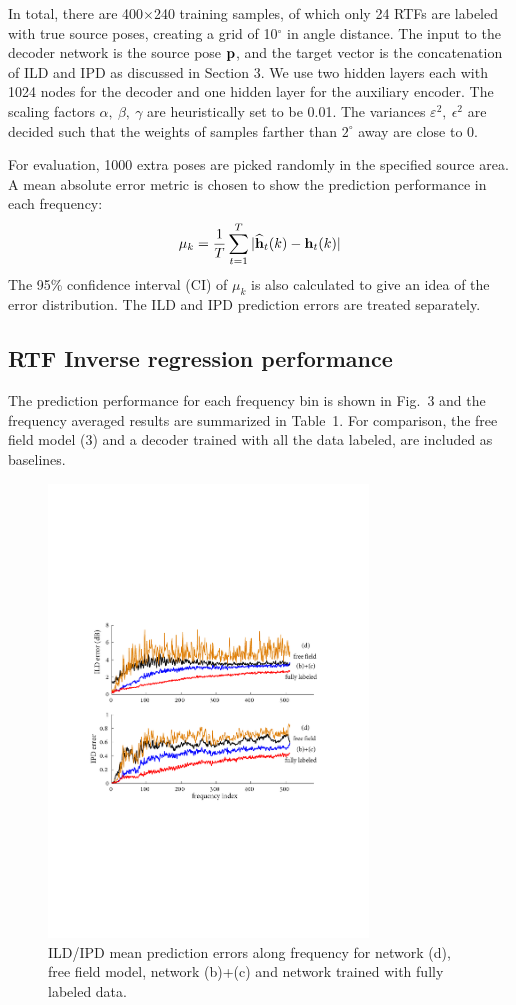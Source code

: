 \documentclass{article}
\begin{document}
In total, there are 400$\times$240 training samples, of which only 24 RTFs are labeled with true source poses, creating a grid of 10$^\circ$ in angle distance. The input to the decoder network is the source pose ${\bf p}$, and the target vector is the concatenation of ILD and IPD as discussed in Section 3. We use two hidden layers each with 1024 nodes for the decoder and one hidden layer for the auxiliary encoder. The scaling factors $\alpha,~\beta,~\gamma$ are heuristically set to be 0.01. The variances $\varepsilon^2,~\epsilon^2$ are decided such that the weights of samples farther than $2^\circ$ away are close to 0.

For evaluation, 1000 extra poses are picked randomly in the specified source area. A mean absolute error metric is chosen to show the prediction performance in each frequency:
\begin{equation}\label{eq:err}
  \mu_k = \frac{1}{T}\sum_{t=1}^{T}|\widehat{\bf h}_t(k)-{\bf h}_t(k)|
\end{equation}
The 95\% confidence interval (CI) of $\mu_k$ is also calculated to give an idea of the error distribution. The ILD and IPD prediction errors are treated separately.

\subsection{RTF Inverse regression performance }

The prediction performance for each frequency bin is shown in Fig.~3 and the frequency averaged results are summarized in Table~1. For comparison, the free field model (3) and a decoder trained with all the data labeled, are included as baselines.

\begin{figure}[tb]
    \centering
    \centerline{\includegraphics[width=8.5cm]{fig3_err_freq.pdf}}
    \caption{ILD/IPD mean prediction errors along frequency for network (d), free field model, network (b)+(c) and network trained with fully labeled data.}
    \label{fig3}
\end{figure}
\end{document}
